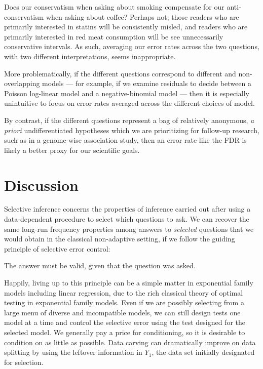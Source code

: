 \documentclass{article}
\theoremstyle{definition}
\newcommand{\sampOrData}{data }
\newcommand{\capSampOrData}{Data }
\begin{document}
Does our conservatism when asking about smoking compensate for our anti-conservatism when asking about coffee? Perhaps not; those readers who are primarily interested in statins will be consistently misled, and readers who are primarily interested in red meat consumption will be see unnecessarily conservative intervals. As such, averaging our error rates across the two questions, with two different interpretations, seems inappropriate.

More problematically, if the different questions correspond to different and non-overlapping models --- for example, if we examine residuals to decide between a Poisson log-linear model and a negative-binomial model --- then it is especially unintuitive to focus on error rates averaged across the different choices of model.

By contrast, if the different questions represent a bag of relatively anonymous, {\em a priori} undifferentiated hypotheses which we are prioritizing for follow-up research, such as in a genome-wise association study, then an error rate like the FDR is likely a better proxy for our scientific goals.

\section{Discussion}\label{sec:discussion}

Selective inference concerns the properties of inference carried out after using a data-dependent procedure to select which questions to ask. We can recover the same long-run frequency properties among answers to {\em selected} questions that we would obtain in the classical non-adaptive setting, if we follow the guiding principle of selective error control:
\begin{center}
The answer must be valid, given that the question was asked.
\end{center}

Happily, living up to this principle can be a simple matter in exponential family models including linear regression, due to the rich classical theory of optimal testing in exponential family models. Even if we are possibly selecting from a large menu of diverse and incompatible models, we can still design tests one model at a time and control the selective error using the test designed for the selected model. We generally pay a price for conditioning, so it is desirable to condition on as little as possible. \capSampOrData carving can dramatically improve on \sampOrData splitting by using the leftover information in $Y_{1}$, the data set initially designated for selection.
\end{document}
